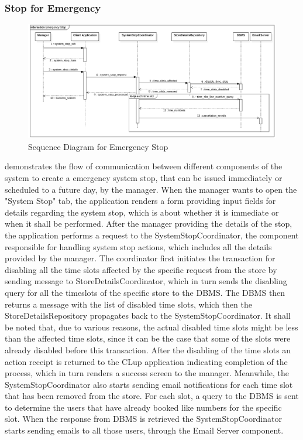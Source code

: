 \subsubsection{Stop for Emergency}
\begin{figure}[H]
    \centering
    \includegraphics[height=0.4\textwidth]{Images/SequenceDiagrams/EmergencyStop.png}
    \caption{Sequence Diagram for Emergency Stop}
    \label{fig:SDEmergencyStop}
\end{figure}
 demonstrates the flow of communication between different components of the system to create a emergency system stop, that can be issued immediately or scheduled to a future day, by the manager.
When the manager wants to open the "System Stop" tab, the application renders a form providing input fields for details regarding the system stop, which is about whether it is immediate or when it shall be performed.
After the manager providing the details of the stop, the application performs a request to the SystemStopCoordinator, the component responsible for handling system stop actions, which includes all the details provided by the manager.
The coordinator first initiates the transaction for disabling all the time slots affected by the specific request from the store by sending message to StoreDetailsCoordinator, which in turn sends the disabling query for all the timeslots of the specific store to the DBMS.
The DBMS then returns a message with the list of disabled time slots, which then the StoreDetailsRepository propagates back to the SystemStopCoordinator.
It shall be noted that, due to various reasons, the actual disabled time slots might be less than the affected time slots, since it can be the case that some of the slots were already disabled before this transaction.
After the disabling of the time slots an action receipt is returned to the CLup application indicating completion of the process, which in turn renders a success screen to the manager.
Meanwhile, the SystemStopCoordinator also starts sending email notifications for each time slot that has been removed from the store.
For each slot, a query to the DBMS is sent to determine the users that have already booked like numbers for the specific slot.
When the response from DBMS is retrieved the SystemStopCoordinator starts sending emails to all those users, through the Email Server component.

